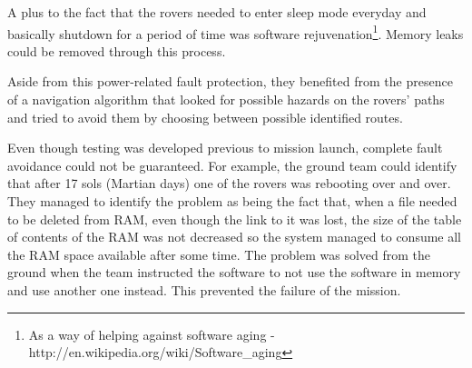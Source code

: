 A plus to the fact that the rovers needed to enter sleep mode everyday and
basically shutdown for a period of time was software rejuvenation\footnote{As a
way of helping against software aging -
http://en.wikipedia.org/wiki/Software\_aging}. Memory leaks could be removed
through this process.

Aside from this power-related fault protection, they benefited from the presence
of a navigation algorithm that looked for possible hazards on the rovers' paths
and tried to avoid them by choosing between possible identified routes.

Even though testing was developed previous to mission launch, complete fault
avoidance could not be guaranteed. For example, the ground team could identify
that after 17 sols (Martian days) one of the rovers was rebooting over and over.
They managed to identify the problem as being the fact that, when a file needed
to be deleted from RAM, even though the link to it was lost, the size of the
table of contents of the RAM was not decreased so the system managed to consume
all the RAM space available after some time. The problem was solved from the
ground when the team instructed the software to not use the software in memory
and use another one instead. This prevented the failure of the mission.


